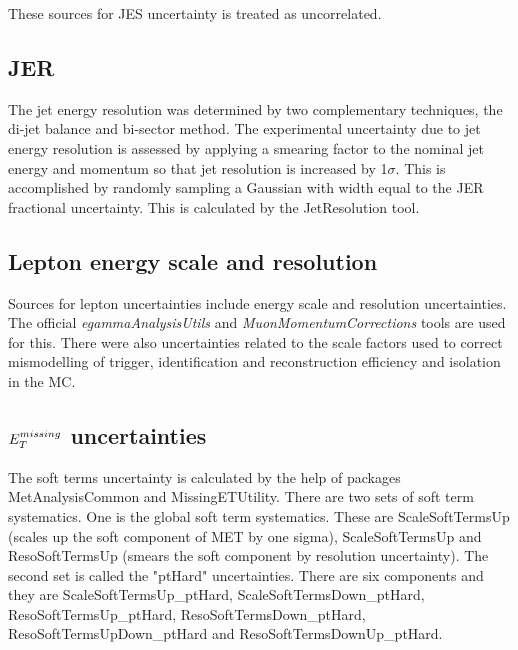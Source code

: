These sources for JES uncertainty is treated as uncorrelated.
\subsection{JER}
The jet energy resolution was determined by two complementary techniques, the di-jet balance and bi-sector method. 
The experimental uncertainty due to jet energy resolution is assessed by applying a smearing factor to the nominal jet energy and momentum so that jet resolution is increased by 1$\sigma$. This is accomplished by randomly sampling a Gaussian with width equal to the JER fractional uncertainty. This is calculated by the JetResolution tool. 

\subsection{Lepton energy scale and resolution}
Sources for lepton uncertainties include energy scale and resolution uncertainties. The official \textit{egammaAnalysisUtils} and \textit{MuonMomentumCorrections}  tools are used for this. There were also uncertainties related to the scale factors used to correct mismodelling of trigger, identification and reconstruction efficiency and isolation in the MC. %
\subsection{$E_{T}^{missing}$ uncertainties}
The soft terms uncertainty is calculated by the help of packages MetAnalysisCommon and MissingETUtility. There are two sets of soft term systematics. One is the global soft term systematics. These are ScaleSoftTermsUp (scales up the soft component of MET by one sigma), ScaleSoftTermsUp and ResoSoftTermsUp (smears the soft component by resolution uncertainty). The second set is called the "ptHard" uncertainties. There are six components and they are ScaleSoftTermsUp\_ptHard, ScaleSoftTermsDown\_ptHard, ResoSoftTermsUp\_ptHard, ResoSoftTermsDown\_ptHard, ResoSoftTermsUpDown\_ptHard and ResoSoftTermsDownUp\_ptHard.
